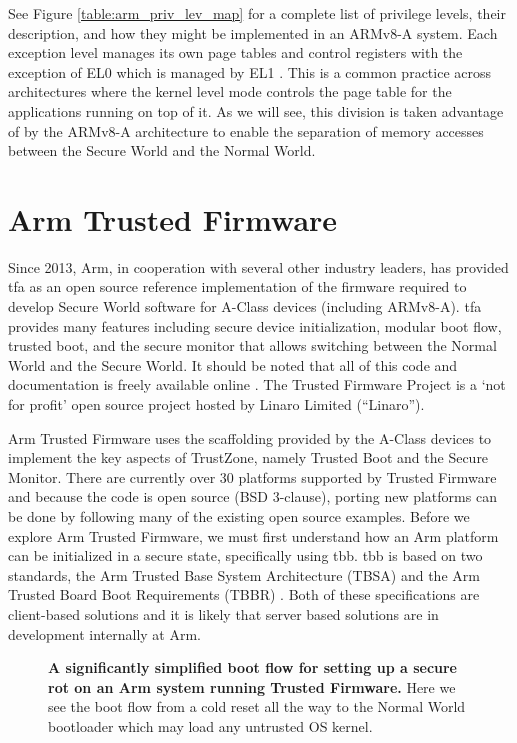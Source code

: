 \renewcommand{\arraystretch}{2.5}


See Figure \ref{table:arm_priv_lev_map} for a complete list of privilege levels, their description, and how they might be implemented in an ARMv8-A system. Each exception level manages its own page tables and control registers with the exception of EL0 which is managed by EL1 \cite{armfundv8A}. This is a common practice across architectures where the kernel level mode controls the page table for the applications running on top of it. As we will see, this division is taken advantage of by the ARMv8-A architecture to enable the separation of memory accesses between the Secure World and the Normal World.

\section{Arm Trusted Firmware}
Since 2013, Arm, in cooperation with several other industry leaders, has provided \gls{tfa} as an open source reference implementation of the firmware required to develop Secure World software for A-Class devices (including ARMv8-A). \gls{tfa} provides many features including secure device initialization, modular boot flow, trusted boot, and the secure monitor that allows switching between the Normal World and the Secure World. It should be noted that all of this code and documentation is freely available online \cite{urlTrustedFirmware}. The Trusted Firmware Project is a `not for profit' open source project hosted by Linaro Limited (``Linaro'').

Arm Trusted Firmware uses the scaffolding provided by the A-Class devices to implement the key aspects of TrustZone, namely Trusted Boot and the Secure Monitor. There are currently over 30 platforms supported by Trusted Firmware and because the code is open source (BSD 3-clause), porting new platforms can be done by following many of the existing open source examples. Before we explore Arm Trusted Firmware, we must first understand how an Arm platform can be initialized in a secure state, specifically using \gls{tbb}. \gls{tbb} is based on two standards, the Arm Trusted Base System Architecture (TBSA) \cite{Edition2018} and the Arm Trusted Board Boot Requirements (TBBR) \cite{ArmTrustedBoot}. Both of these specifications are client-based solutions and it is likely that server based solutions are in development internally at Arm.

\begin{figure}[ht]
\centering

\caption[Arm's Trusted Board Boot]{\textbf{A significantly simplified boot flow for setting up a secure \gls{rot} on an Arm system running Trusted Firmware.} Here we see the boot flow from a cold reset all the way to the Normal World bootloader which may load any untrusted OS kernel.}
\label{fig:tbb-flow}
\end{figure}

